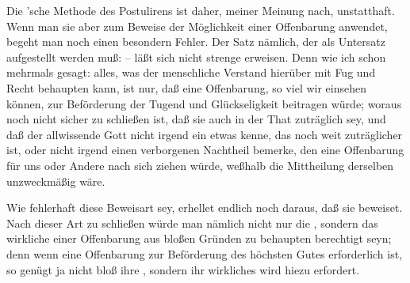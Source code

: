 \begin{aufza}
\item Die 'sche Methode des Postulirens ist daher, meiner Meinung nach,  unstatthaft. Wenn man sie aber zum Beweise der Möglichkeit einer Offenbarung anwendet, begeht man noch einen besondern Fehler. Der Satz nämlich, der als Untersatz aufgestellt werden muß:  -- läßt sich nicht strenge erweisen. Denn wie ich schon mehrmals gesagt: alles, was der menschliche Verstand hierüber mit Fug und Recht behaupten kann, ist nur, daß eine Offenbarung, so viel wir einsehen können, zur Beförderung der Tugend und Glückseligkeit beitragen würde; woraus noch nicht sicher zu schließen ist, daß sie auch in der That zuträglich sey, und daß der allwissende Gott nicht irgend ein etwas kenne, das noch weit zuträglicher ist, oder nicht irgend einen verborgenen Nachtheil bemerke, den eine Offenbarung für uns oder Andere nach sich ziehen würde, weßhalb die Mittheilung derselben unzweckmäßig wäre.~
\item Wie fehlerhaft diese Beweisart sey, erhellet endlich noch daraus, daß sie  beweiset. Nach dieser Art zu schließen würde man nämlich nicht nur die , sondern das wirkliche  einer Offenbarung aus bloßen Gründen  zu behaupten berechtigt seyn; denn wenn eine Offenbarung zur Beförderung des höchsten Gutes erforderlich ist, so genügt ja nicht bloß ihre , sondern ihr wirkliches  wird hiezu erfordert.
\end{aufza}

